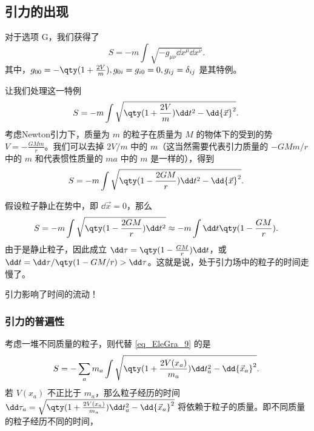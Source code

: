 \subsection{引力的出现}
对于选项 G，我们获得了
\begin{equation}
S=-m\int\sqrt{-g_{\mu\nu}\dd x^\mu\dd x^\nu}.~
\end{equation}
其中，$g_{00}=-\qty(1+\frac{2V}{m}),g_{0i}=g_{i0}=0,g_{ij}=\delta_{ij}$ 是其特例。

让我们处理这一特例
\begin{equation}\label{eq_EleGra_9}
S=-m\int\sqrt{\qty(1+\frac{2V}{m})\dd t^2-\dd {\vec x}^2}.~
\end{equation}
考虑Newton引力下，质量为 $m$ 的粒子在质量为 $M$ 的物体下的受到的势 $V=-\frac{GMm}{r}$。我们可以去掉 $2V/m$ 中的 $m$（这当然需要代表引力质量的 $-GMm/r$ 中的 $m$ 和代表惯性质量的 $ma$ 中的 $m$ 是一样的），得到
\begin{equation}
S=-m\int\sqrt{\qty(1-\frac{2GM}{r})\dd t^2-\dd {\vec x}^2}.~
\end{equation}

假设粒子静止在势中，即 $\dd {\vec x}=0$，那么
\begin{equation}
S=-m\int\sqrt{\qty(1-\frac{2GM}{r})\dd t^2}\approx-m\int\dd t\qty(1-\frac{GM}{r}).~
\end{equation}
由于是静止粒子，因此成立 $\dd\tau=\qty(1-\frac{GM}{r})\dd t$，或 $\dd t=\dd \tau/\qty(1-GM/r)>\dd\tau$。这就是说，处于引力场中的粒子的时间走慢了。

引力影响了时间的流动！

\subsubsection{引力的普遍性}
考虑一堆不同质量的粒子，则代替 \autoref{eq_EleGra_9} 的是
\begin{equation}
S=-\sum_a m_a\int\sqrt{\qty(1+\frac{2V(x_a)}{m_a})\dd t_a^2-\dd {\vec x_a}^2}.~
\end{equation}
若 $V(x_a)$ 不正比于 $m_a$，那么粒子经历的时间 $\dd \tau_a=\sqrt{\qty(1+\frac{2V(x_a)}{m_a})\dd t_a^2-\dd {\vec x_a}^2}$ 将依赖于粒子的质量。即不同质量的粒子经历不同的时间，










